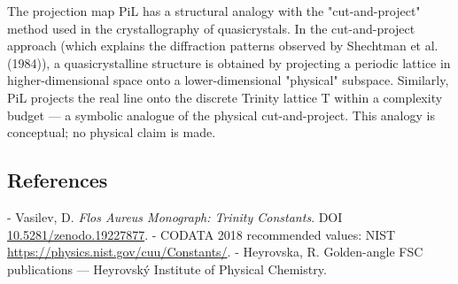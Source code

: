   The projection map PiL has a structural analogy with the "cut-and-project" method used
  in the crystallography of quasicrystals. In the cut-and-project approach (which explains
  the diffraction patterns observed by Shechtman et al. (1984)), a quasicrystalline
  structure is obtained by projecting a periodic lattice in higher-dimensional space onto a
  lower-dimensional "physical" subspace. Similarly, PiL projects the real line onto the
  discrete Trinity lattice T within a complexity budget --- a symbolic analogue of the
  physical cut-and-project. This analogy is conceptual; no physical claim is made.

\subsection{References}

- Vasilev, D. \textit{Flos Aureus Monograph: Trinity Constants}. DOI \href{https://zenodo.org/doi/10.5281/zenodo.19227877}{10.5281/zenodo.19227877}.
- CODATA 2018 recommended values: NIST \href{https://physics.nist.gov/cuu/Constants/}{https://physics.nist.gov/cuu/Constants/}.
- Heyrovska, R. Golden-angle FSC publications --- Heyrovský Institute of Physical Chemistry.
